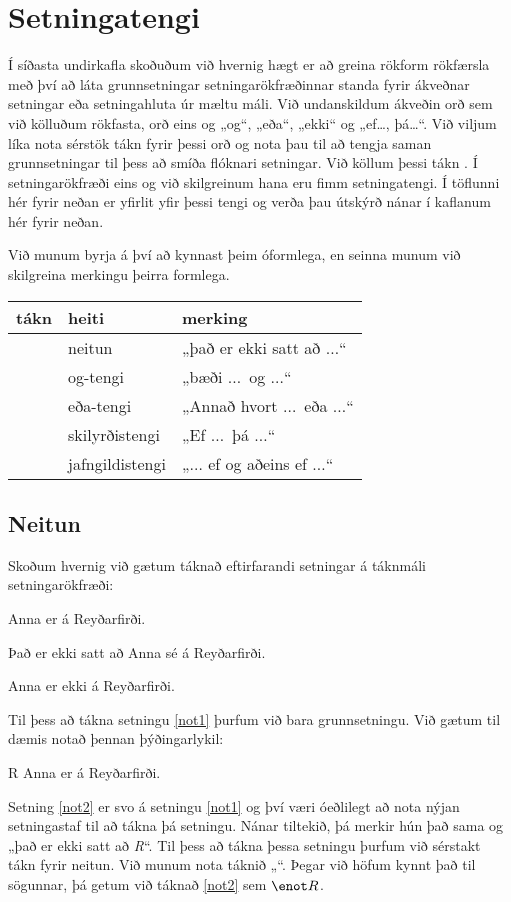 \chapter{Setningatengi}\label{s:TFLConnectives}
Í síðasta undirkafla skoðuðum við hvernig hægt er að greina rökform rökfærsla með því að láta grunnsetningar setningarökfræðinnar standa fyrir ákveðnar setningar eða setningahluta úr mæltu máli. Við undanskildum ákveðin orð sem við kölluðum rökfasta, orð eins og „og“, „eða“, „ekki“ og „ef\ldots, þá\ldots“. Við viljum líka nota sérstök tákn fyrir þessi orð og nota þau til að tengja saman grunnsetningar til þess að smíða flóknari setningar. Við köllum þessi tákn . Í setningarökfræði eins og við skilgreinum hana eru fimm setningatengi. Í töflunni hér fyrir neðan er yfirlit yfir þessi tengi og verða þau útskýrð nánar í kaflanum hér fyrir neðan.

Við munum byrja á því að kynnast þeim óformlega, en seinna munum við skilgreina merkingu þeirra formlega.
	\begin{table}[h]
	\center
	\begin{tabular}{l l l}
	
	\textbf{tákn}&\textbf{heiti}&\textbf{merking}\\
	\hline
	\enot&neitun&„það er ekki satt að $\ldots$“\\
	\eand&og-tengi&„bæði $\ldots$\ og $\ldots$“\\
	\eor&eða-tengi&„Annað hvort $\ldots$\ eða $\ldots$“\\
	\eif&skilyrðistengi&„Ef $\ldots$\ þá $\ldots$“\\
	\eiff&jafngildistengi&„$\ldots$ ef og aðeins ef $\ldots$“\\
	
	\end{tabular}
	\end{table}

\section{Neitun}
Skoðum hvernig við gætum táknað eftirfarandi setningar á táknmáli setningarökfræði:
	\begin{earg}
	\item[\ex{not1}] Anna er á Reyðarfirði.
	\item[\ex{not2}] Það er ekki satt að Anna sé á Reyðarfirði.
	\item[\ex{not3}] Anna er ekki á Reyðarfirði.
	\end{earg}
Til þess að tákna setningu \ref{not1} þurfum við bara grunnsetningu. Við gætum til dæmis notað þennan þýðingarlykil:
	\begin{ekey}
		\item[R] Anna er á Reyðarfirði.
	\end{ekey}
Setning \ref{not2} er svo  á setningu \ref{not1} og því væri óeðlilegt að nota nýjan setningastaf til að tákna þá setningu. Nánar tiltekið, þá merkir hún það sama og „það er ekki satt að \emph{R}“. Til þess að tákna þessa setningu þurfum við sérstakt tákn fyrir neitun. Við munum nota táknið „\enot“. Þegar við höfum kynnt það til sögunnar, þá getum við táknað \ref{not2} sem $\enot R$.

